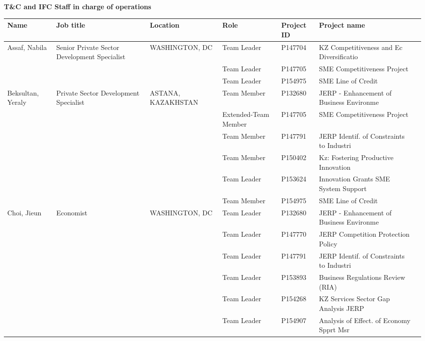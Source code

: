\documentclass{article}\usepackage[]{graphicx}\usepackage[]{color}
\begin{document}
\begin{minipage}[b]{0.99\textwidth}
  \vspace*{1cm}
  \raggedright{\color{white!30!blue} \textbf{\large T\&C and IFC Staff in charge of operations}}
  \vspace*{0.5cm}
     
{\footnotesize
\begin{longtable}{>{\raggedright}p{1.4in}>{\raggedright}p{1in}>{\raggedright}p{1in}>{\raggedright}p{1in}l>{\raggedright}p{1.5in}l}
 Name & Job title & Location & Role & Project ID & Project name &  \\ 
  \hline
Assaf, Nabila & Senior Private Sector Development Specialist & WASHINGTON, DC & Team Leader & P147704 & KZ Competitiveness and Ec Diversificatio &  \\ 
   &  &  & Team Leader & P147705 & SME Competitiveness Project &  \\ 
   &  &  & Team Leader & P154975 & SME Line of Credit &  \\ 
  Beksultan, Yeraly & Private Sector Development Specialist & ASTANA, KAZAKHSTAN & Team Member & P132680 & JERP - Enhancement of Business Environme &  \\ 
   &  &  & Extended-Team Member & P147705 & SME Competitiveness Project &  \\ 
   &  &  & Team Member & P147791 & JERP Identif. of Constraints to Industri &  \\ 
   &  &  & Team Member & P150402 & Kz: Fostering Productive Innovation &  \\ 
   &  &  & Team Leader & P153624 & Innovation Grants SME System Support &  \\ 
   &  &  & Team Member & P154975 & SME Line of Credit &  \\ 
  Choi, Jieun & Economist & WASHINGTON, DC & Team Leader & P132680 & JERP - Enhancement of Business Environme &  \\ 
   &  &  & Team Leader & P147770 & JERP Competition Protection Policy &  \\ 
   &  &  & Team Leader & P147791 & JERP Identif. of Constraints to Industri &  \\ 
   &  &  & Team Leader & P153893 & Business Regulations Review (RIA) &  \\ 
   &  &  & Team Leader & P154268 & KZ Services Sector Gap Analysis JERP &  \\ 
   &  &  & Team Leader & P154907 & Analysis of Effect. of Economy Spprt Msr &  \\ 

\end{longtable}}
\end{minipage}
\end{document}
